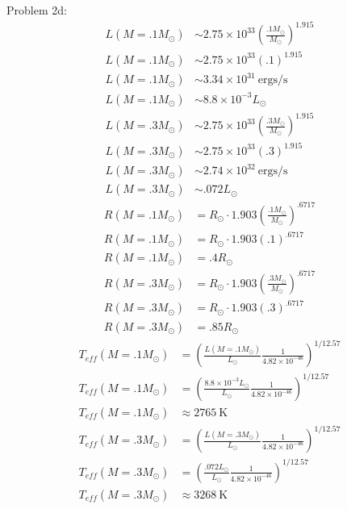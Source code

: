 \documentclass[10pt,letter,preprint]{aastex}
\newcommand{\lp}{\left(}
\newcommand{\rp}{\right)}
\begin{document}
Problem 2d:
\begin{align}
L(M=.1M_\odot) &  \sim 2.75 \times 10^{33} \lp \frac{.1M_\odot}{M_\odot} \rp^{1.915}\\
L(M=.1M_\odot) &  \sim 2.75 \times 10^{33} \lp .1 \rp^{1.915}\\
L(M=.1M_\odot) &  \sim 3.34 \times 10^{31} ~\text{ergs/s}\\
L(M=.1M_\odot) &  \sim 8.8 \times 10^{-3} L_\odot
\end{align}
\begin{align}
L(M=.3M_\odot) &  \sim 2.75 \times 10^{33} \lp \frac{.3M_\odot}{M_\odot} \rp^{1.915}\\
L(M=.3M_\odot) &  \sim 2.75 \times 10^{33} \lp .3 \rp^{1.915}\\
L(M=.3M_\odot) &  \sim 2.74 \times 10^{32}~\text{ergs/s} \\
L(M=.3M_\odot) &  \sim .072 L_\odot
\end{align}
\begin{align}
R(M=.1M_\odot) & = R_\odot \cdot 1.903 \lp \frac{.1M_\odot}{M_\odot} \rp^{.6717}\\
R(M=.1M_\odot) & = R_\odot \cdot 1.903 \lp .1\rp^{.6717}\\
R(M=.1M_\odot) & =.4 R_\odot
\end{align}
\begin{align}
R(M=.3M_\odot) & = R_\odot \cdot 1.903 \lp \frac{.3M_\odot}{M_\odot} \rp^{.6717}\\
R(M=.3M_\odot) & = R_\odot \cdot 1.903 \lp .3\rp^{.6717}\\
R(M=.3M_\odot) & =.85 R_\odot
\end{align}
\begin{align}
T_{eff}(M=.1M_\odot) & = \lp \frac{L(M=.1M_\odot)}{L_\odot} \frac{1}{4.82 \times 10^{-46}} \rp^{1/12.57}\\
T_{eff}(M=.1M_\odot) & = \lp \frac{8.8 \times 10^{-3} L_\odot}{L_\odot} \frac{1}{4.82 \times 10^{-46}} \rp^{1/12.57}\\
T_{eff}(M=.1M_\odot) & \approx 2765~\text{K}
\end{align}
\begin{align}
T_{eff}(M=.3M_\odot) & = \lp \frac{L(M=.3M_\odot)}{L_\odot} \frac{1}{4.82 \times 10^{-46}} \rp^{1/12.57}\\
T_{eff}(M=.3M_\odot) & = \lp \frac{.072 L_\odot}{L_\odot} \frac{1}{4.82 \times 10^{-46}} \rp^{1/12.57}\\
T_{eff}(M=.3M_\odot) & \approx 3268~\text{K}
\end{align}
\end{document}

